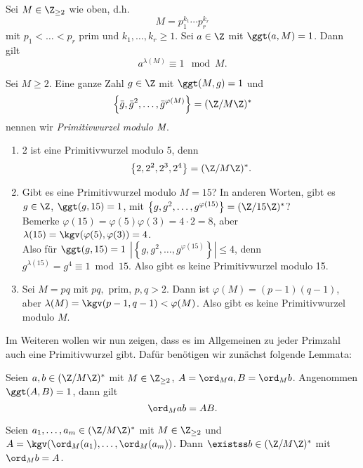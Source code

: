 \begin{thm}\autolabel
	Sei $M \in \Z_{\geq 2}$ wie oben, d.h.
	\[ M = p_1^{k_1} \dotsm p_r^{k_r} \]
	mit $p_1 < \dots < p_r$ prim und $k_1, \dotsc, k_r \geq 1$. Sei $a \in \Z$ mit $\ggt(a,M)=1$. Dann gilt
	\[ a^{\lambda(M)} \equiv 1 \mod M. \]
\end{thm}

\begin{defn*}[Primitivwurzel]
	Sei $M \geq 2$. Eine ganze Zahl $g \in \Z$ mit $\ggt(M,g)=1$ und 
	\[ \left\{ \bar{g}, \bar{g}^2,\dotsc, \bar{g}^{\varphi(M)} \right\} = (\Z/M\Z)^* \]
	nennen wir \emph{Primitivwurzel modulo $\emph{M}$}.
\end{defn*}

\begin{exmp*}
	\begin{enumerate}
		\item 2 ist eine Primitivwurzel modulo 5, denn
		\[ \left\{2,2^2,2^3,2^4 \right\} = (\Z/M\Z)^*. \]
		\item Gibt es eine Primitivwurzel modulo $M=15$? In anderen Worten, gibt es $g \in \Z$, $\ggt(g,15)=1$, mit $\left\{ g,g^2,\dotsc,g^{\varphi(15)} \right\} = (\Z/15\Z)^*$?\\
			Bemerke $\varphi(15) = \varphi(5)\varphi(3) = 4 \cdot 2 = 8$, aber $\lambda(15) = \kgv(\varphi(5),\varphi(3)) = 4$.\\
			Also für $\ggt(g,15) = 1$ $\left|\left\{ g,g^2,\dotsc, g^{\varphi(15)} \right\}\right| \leq 4$, denn $g^{\lambda(15)} = g^4 \equiv 1 \bmod 15$. Also gibt es keine Primitivwurzel modulo 15.
		\item Sei $M = pq$ mit $pq,$ prim, $p,q > 2$. Dann ist $\varphi(M) = (p-1)(q-1)$, aber $\lambda(M) = \kgv(p-1,q-1) < \varphi(M)$. Also gibt es keine Primitivwurzel modulo $M$.
	\end{enumerate}
\end{exmp*}

Im Weiteren wollen wir nun zeigen, dass es im Allgemeinen zu jeder Primzahl auch eine Primitivwurzel gibt. Dafür benötigen wir zunächst folgende Lemmata:

\begin{lem}\autolabel
	Seien $a,b \in (\Z/M\Z)^*$ mit $M \in \Z_{\geq 2}$, $A = \ord_M a, B = \ord_M b$. Angenommen $\ggt(A,B)=1$, dann gilt
	\[ \ord_M ab = AB. \]
\end{lem}

\begin{lem}\autolabel
	Seien $a_1,\dotsc,a_m \in (\Z/M\Z)^*$ mit $M \in \Z_{\geq 2}$ und $A = \kgv(\ord_M(a_1),\dotsc, \ord_M(a_m))$. Dann $\existss b \in (\Z/M\Z)^*$ mit $\ord_M b = A$.
\end{lem}

